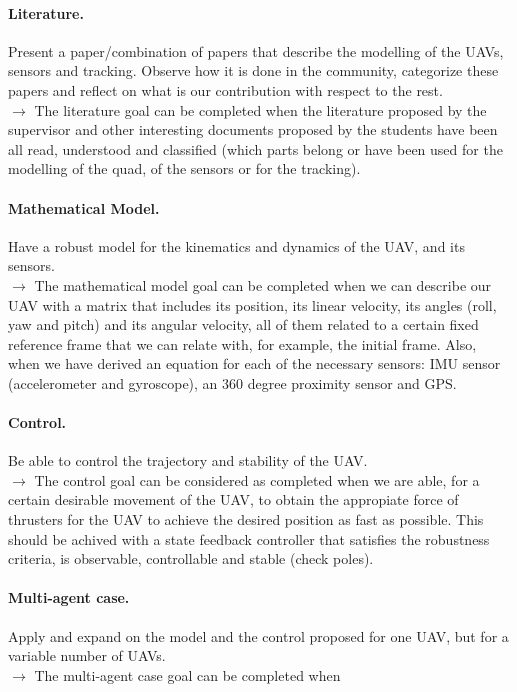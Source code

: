 \documentclass{article}
\begin{document}
		\paragraph{Literature.} Present a paper/combination of papers that describe the modelling of the UAVs, sensors and tracking. Observe how it is done in the community, categorize these papers and reflect on what is our contribution with respect to the rest.\\  $\rightarrow$ The literature goal can be completed when the literature proposed by the supervisor and other interesting documents proposed by the students have been all read, understood and classified (which parts belong or have been used for the modelling of the quad, of the sensors or for the tracking). %
		
		\paragraph{Mathematical Model.} Have a robust model for the kinematics and dynamics of the UAV, and its sensors.\\
		$\rightarrow$ The mathematical model goal can be completed when we can describe our UAV with a matrix that includes its position, its linear velocity, its angles (roll, yaw and pitch) and its angular velocity, all of them related to a certain fixed reference frame that we can relate with, for example, the initial frame. Also, when we have derived an equation for each of the necessary sensors: IMU sensor (accelerometer and gyroscope), an 360 degree proximity sensor and GPS. %
			
		\paragraph{Control.} Be able to control the trajectory and stability of the UAV. \\
		$\rightarrow$ The control goal can be considered as completed when we are able, for a certain desirable movement of the UAV, to obtain the appropiate force of thrusters for the UAV to achieve the desired position as fast as possible. This should be achived with a state feedback controller that satisfies the robustness criteria, is observable, controllable and stable (check poles). %
			
		\paragraph{	Multi-agent case.} Apply and expand  on the model and the control proposed for one UAV, but for a variable number of UAVs.\\
		$\rightarrow$ The multi-agent case goal can be completed when 
		
\end{document}
